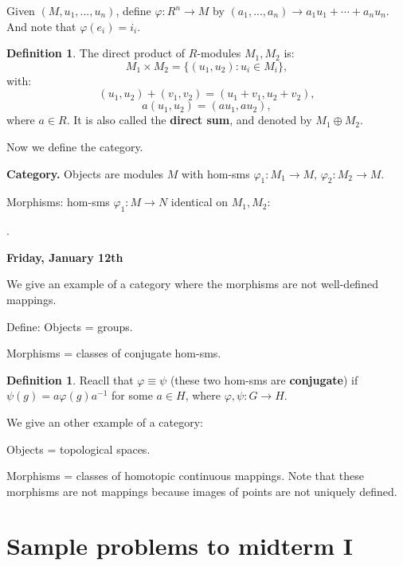 \documentclass[9pt,reqno,twoside]{amsbook}
\theoremstyle{plain}
\numberwithin{section}{chapter}
\numberwithin{equation}{chapter}
\theoremstyle{definition}
\newtheorem{Def}[theorem]{Definition}
\theoremstyle{remark}
\theoremstyle{plain}
\renewcommand{\phi}{\varphi}
\begin{document}
Given $(M,u_1,...,u_n)$, define $\phi:R^n \to M$ by $(a_1,...,a_n) \to a_1u_1 + \cdots + a_nu_n$. And note that $\phi(e_i) = i_i$. 

\begin{Def}
The direct product of $R$-modules $M_1,M_2$ is:
 $$
M_1\times M_2 = \{(u_1,u_2):u_i \in M_i\},
$$
with:
$$
(u_1,u_2) + (v_1,v_2) = (u_1 + v_1, u_2 + v_2),
$$
$$
a(u_1,u_2) = (au_1,au_2),
$$
where $a \in R$. It is also called the \textbf{direct sum}, and denoted by $M_1 \oplus M_2$. 
\end{Def}

Now we define the category. 

\textbf{Category.} Objects are modules $M$ with hom-sms $\phi_1:M_1 \to M$, $\phi_2:M_2 \to M$. 

Morphisms: hom-sms $\phi_1:M \to N$ identical on $M_1,M_2$:

\begin{center}
. 
\end{center}







\textbf{Friday, January 12th}


We give an example of a category where the morphisms are not well-defined mappings. 

Define:
Objects = groups. 

Morphisms = classes of conjugate hom-sms. 

\begin{Def}
Reacll that $\phi \equiv \psi$ (these two hom-sms are \textbf{conjugate}) if $\psi(g) = a\phi(g)a^{-1}$ for some $a \in H$, where $\phi,\psi:G \to H$. 
\end{Def}

We give an other example of a category: 

Objects = topological spaces. 

Morphisms = classes of homotopic continuous mappings. Note that these morphisms are not mappings because images of points are not uniquely defined. 


\chapter{Sample problems to midterm I}
\end{document}
